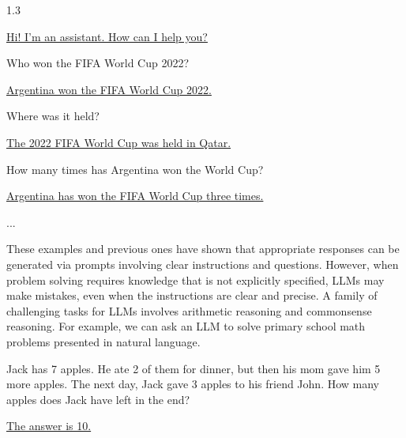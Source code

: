 \vspace{0.5em}
\begin{tcolorbox}
\begin{center}
\parbox{0.9\textwidth}
{

\begin{spacing}{1.3}

\underline{ Hi! I'm an assistant. How can I help you?}

{\color{blue} Who won the FIFA World Cup 2022?}

\underline{Argentina won the FIFA World Cup 2022.}

{\color{blue} Where was it held?}

\underline{The 2022 FIFA World Cup was held in Qatar.}

{\color{blue} How many times has Argentina won the World Cup?}

\underline{Argentina has won the FIFA World Cup three times.}

...

\end{spacing}

}
\end{center}
\end{tcolorbox}
\vspace{0.5em}

These examples and previous ones have shown that appropriate responses can be generated via prompts involving clear instructions and questions. However, when problem solving requires knowledge that is not explicitly specified, LLMs may make mistakes, even when the instructions are clear and precise. A family of challenging tasks for LLMs involves arithmetic reasoning and commonsense reasoning. For example, we can ask an LLM to solve primary school math problems presented in natural language.

\vspace{0.5em}
\begin{tcolorbox}
\begin{center}
\parbox{0.9\textwidth}
{

{\color{blue} Jack has 7 apples. He ate 2 of them for dinner, but then his mom gave him 5 more apples. The next day, Jack gave 3 apples to his friend John. How many apples does Jack have left in the end?}

\vspace{0.3em}

\underline{The answer is 10.}

}
\end{center}
\end{tcolorbox}
\vspace{0.5em}


